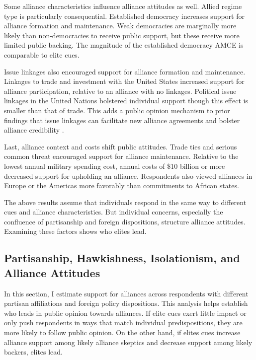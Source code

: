\documentclass[12pt]{article}
\begin{document}
Some alliance characteristics influence alliance attitudes as well. 
Allied regime type is particularly consequential. 
Established democracy increases support for alliance formation and maintenance.  
Weak democracies are marginally more likely than non-democracies to receive public support, but these receive more limited public backing.
The magnitude of the established democracy AMCE is comparable to elite cues. 


Issue linkages also encouraged support for alliance formation and maintenance. 
Linkages to trade and investment with the United States increased support for alliance participation, relative to an alliance with no linkages. 
Political issue linkages in the United Nations bolstered individual support though this effect is smaller than that of trade. 
This adds a public opinion mechanism to prior findings that issue linkages can facilitate new alliance agreements \citep{Poast2012} and bolster alliance credibility \citep{Poast2013}. 


Last, alliance context and costs shift public attitudes. 
Trade ties and serious common threat encouraged support for alliance maintenance. 
Relative to the lowest annual military spending cost, annual costs of \$10 billion or more decreased support for upholding an alliance.  
Respondents also viewed alliances in Europe or the Americas more favorably than commitments to African states. 


The above results assume that individuals respond in the same way to different cues and alliance characteristics. 
But individual concerns, especially the confluence of partisanship and foreign dispositions, structure alliance attitudes.
Examining these factors shows who elites lead.  



\subsection{Partisanship, Hawkishness, Isolationism, and Alliance Attitudes}



In this section, I estimate support for alliances across respondents with different partisan affiliations and foreign policy dispositions.  
This analysis helps establish who leads in public opinion towards alliances. 
If elite cues exert little impact or only push respondents in ways that match individual predispositions, they are more likely to follow public opinion. 
On the other hand, if elites cues increase alliance support among likely alliance skeptics and decrease support among likely backers, elites lead. 
\end{document}
